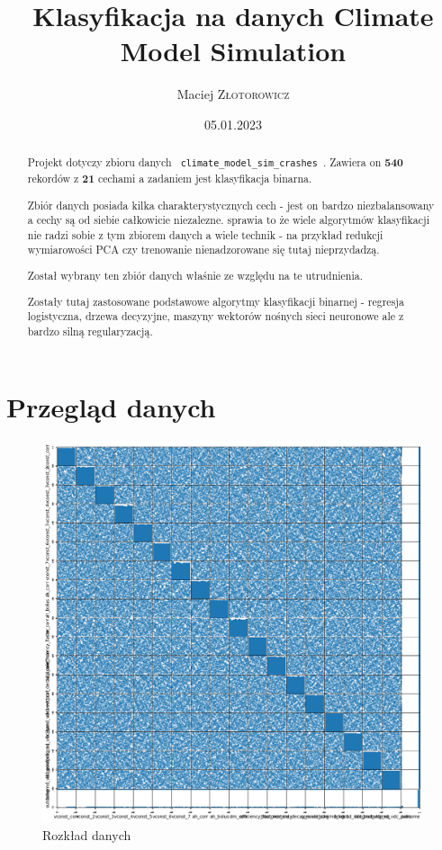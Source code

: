 \documentclass[12pt]{article}
\author{Maciej \textsc{Złotorowicz}}
\title{\textbf{Klasyfikacja na danych \linebreak Climate Model Simulation}}
\date{05.01.2023}
\def\code#1{\texttt{#1}}
\begin{document}
    \maketitle
    \newpage


    \begin{abstract}
        Projekt dotyczy zbioru danych \code{ climate\_model\_sim\_crashes }. Zawiera on \textbf{540} rekordów z \textbf{21} 
        cechami a zadaniem jest klasyfikacja binarna. 
        

        Zbiór danych posiada kilka charakterystycznych cech - jest on bardzo niezbalansowany a cechy są od siebie całkowicie niezalezne.
        sprawia to że wiele algorytmów klasyfikacji nie radzi sobie z tym zbiorem danych a wiele technik - na przykład redukcji
        wymiarowości PCA czy trenowanie nienadzorowane się tutaj nieprzydadzą.  

        Został wybrany ten zbiór danych właśnie ze względu na te utrudnienia.

        Zostały tutaj zastosowane podstawowe algorytmy klasyfikacji binarnej - regresja logistyczna, drzewa decyzyjne, 
        maszyny wektorów nośnych sieci neuronowe ale z bardzo silną regularyzacją. 
    \end{abstract}
    
    \newpage

    \section{Przegląd danych}
        \begin{figure}[h!]
            \centering
            \includegraphics[width=\textwidth]{resources/scatter.png}
            \caption{Rozkład danych}
            \label{fig:scatter}
        \end{figure}
\end{document}

